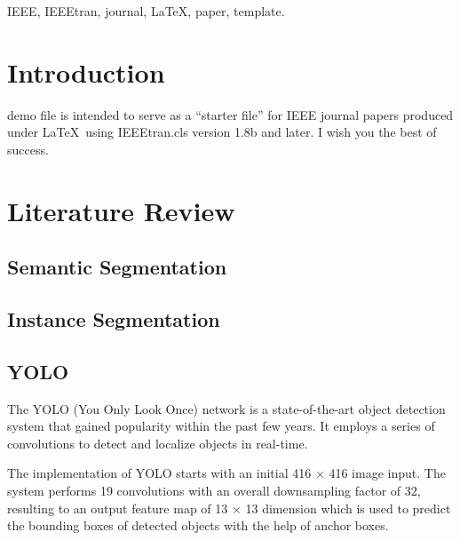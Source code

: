 \documentclass[journal]{IEEEtran}
\begin{document}
\begin{IEEEkeywords}
IEEE, IEEEtran, journal, \LaTeX, paper, template.
\end{IEEEkeywords}






%
\IEEEpeerreviewmaketitle



\section{Introduction}
 demo file is intended to serve as a ``starter file''
for IEEE journal papers produced under \LaTeX\ using
IEEEtran.cls version 1.8b and later.
I wish you the best of success.

\section{Literature Review}
\subsection{Semantic Segmentation}
\subsection{Instance Segmentation}
\subsection{YOLO}
The YOLO (You Only Look Once) network \cite{redmon2016yolo9000} is a state-of-the-art object detection system that gained popularity within the past few years. It employs a series of convolutions to detect and localize objects in real-time.

The implementation of YOLO starts with an initial 416 $\times$ 416 image input. The system performs 19 convolutions with an overall downsampling factor of 32, resulting to an output feature map of 13 $\times$ 13 dimension which is used to predict the bounding boxes of detected objects with the help of anchor boxes.
\end{document}
